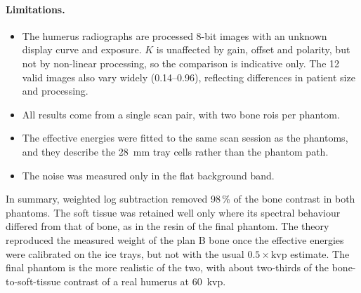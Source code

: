 \paragraph{Limitations.}
\begin{itemize}
    \item The humerus radiographs are processed 8-bit images with an unknown display curve and exposure. $K$ is unaffected by gain, offset and polarity, but not by non-linear processing, so the comparison is indicative only. The 12 valid images also vary widely (0.14--0.96), reflecting differences in patient size and processing.
    \item All results come from a single scan pair, with two bone \glspl{roi} per phantom.
    \item The effective energies were fitted to the same scan session as the phantoms, and they describe the 28~mm tray cells rather than the phantom path.
    \item The noise was measured only in the flat background band.
\end{itemize}

In summary, weighted log subtraction removed 98\,\% of the bone contrast in both phantoms. The soft tissue was retained well only where its spectral behaviour differed from that of bone, as in the resin of the final phantom. The theory reproduced the measured weight of the plan B bone once the effective energies were calibrated on the ice trays, but not with the usual $0.5\times$\gls{kvp} estimate. The final phantom is the more realistic of the two, with about two-thirds of the bone-to-soft-tissue contrast of a real humerus at 60~\gls{kvp}.
